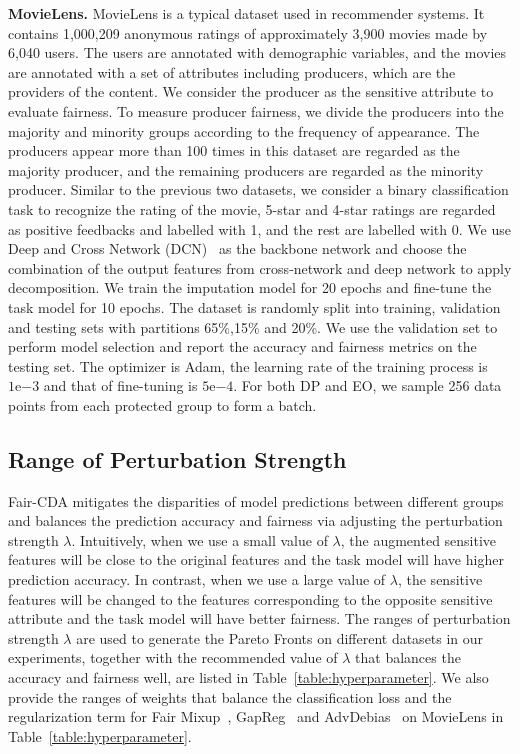 \noindent\textbf{MovieLens.} MovieLens is a typical dataset used in recommender systems. It contains 1,000,209 anonymous ratings of approximately 3,900 movies made by 6,040 users. The users are annotated with demographic variables, and the movies are annotated with a set of attributes including producers, which are the providers of the content. We consider the producer as the sensitive attribute to evaluate fairness. 
To measure producer fairness, we divide the producers into the majority and minority groups according to the frequency of appearance. The producers appear more than 100 times in this dataset are regarded as the majority producer, and the remaining producers are regarded as the minority producer. 
Similar to the previous two datasets, we consider a binary classification task to recognize the rating of the movie, 5-star and 4-star ratings are regarded as positive feedbacks and labelled with 1, and the rest are labelled with 0. We use Deep and Cross Network (DCN)~\cite{wang2017deep} as the backbone network and choose the combination of the output features from cross-network and deep network to apply decomposition. We train the imputation model for 20 epochs and fine-tune the task model for 10 epochs. The dataset is randomly split into training, validation and testing sets with partitions 65\%,15\% and 20\%. We use the validation set to perform model selection and report the accuracy and fairness metrics on the testing set. The optimizer is Adam, the learning rate of the training process is $1\mathrm{e}{-3}$ and that of fine-tuning is $5\mathrm{e}{-4}$. For both DP and EO, we sample 256 data points from each protected group to form a batch.






\subsection{Range of Perturbation Strength} 
Fair-CDA mitigates the disparities of model predictions between different groups and balances the prediction accuracy and fairness via adjusting the perturbation strength $\lambda$. Intuitively, when we use a small value of $\lambda$, the augmented sensitive features will be close to the original features and the task model will have higher prediction accuracy. In contrast, when we use a large value of $\lambda$, the sensitive features will be changed to the features corresponding to the opposite sensitive attribute and the task model will have better fairness. 
The ranges of perturbation strength $\lambda$ are used to generate the Pareto Fronts on different datasets in our experiments, together with the recommended value of $\lambda$ that balances the accuracy and fairness well, are listed in Table~\ref{table:hyperparameter}. We also provide the ranges of weights that balance the classification loss and the regularization term for Fair Mixup~\cite{chuang2021fair}, GapReg~\cite{chuang2021fair} and AdvDebias~\cite{zhang2018mitigating} on MovieLens in Table~\ref{table:hyperparameter}.

